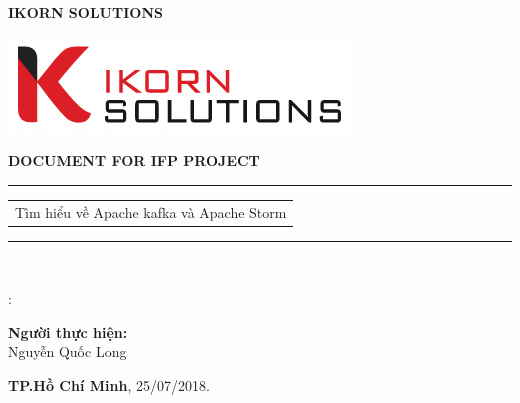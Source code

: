 \documentclass{hcmutarticle}
\begin{document}
\thispagestyle{empty}
\begin{center}
\LARGE\bfseries IKORN SOLUTIONS \\
\end{center}

\begin{center}
\includegraphics[scale=1]{ikorn.jpg}\\[1cm]
\end{center}

\vspace{1cm}

\begin{center}
\Large \bfseries DOCUMENT FOR IFP PROJECT\\[0.5cm]
\end{center}
\rule{\textwidth}{1pt}
\vspace{2pt}
\begin{center}
\Huge
\begin{tabular}{@{}l}
Tìm hiểu về Apache kafka và Apache Storm\\[6pt]
\end{tabular}
\end{center}
\rule{\textwidth}{1pt}\\[1cm]

\vspace{2cm}

\begin{minipage}[t]{0.60\linewidth}
\textbf{}:
\end{minipage}
\begin{minipage}[t]{0.40\linewidth}
\textbf{Người thực hiện:}\\
Nguyễn Quốc Long
\end{minipage}

\vspace{3cm}

\begin{center}

\textbf{TP.Hồ Chí Minh},
25/07/2018.

\end{center}



\newpage

\tableofcontents 

\newpage
\end{document}
